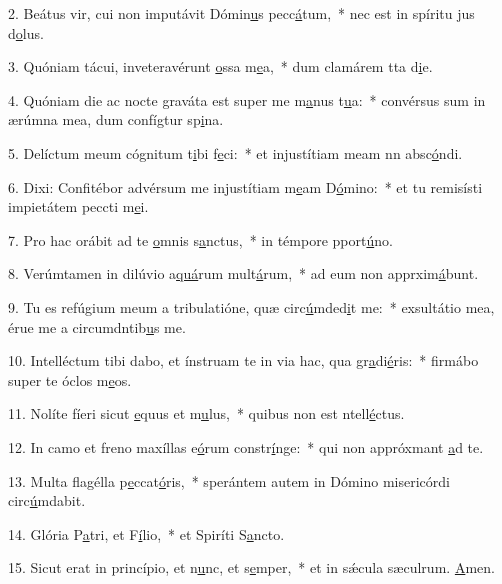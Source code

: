 2. Beátus vir, cui non imputávit Dómin\uline{u}s pecc\uline{á}tum,~* nec est in spíritu jus d\uline{o}lus.\par 
3. Quóniam tácui, inveteravérunt \uline{o}ssa m\uline{e}a,~* dum clamárem tta d\uline{i}e.\par 
4. Quóniam die ac nocte graváta est super me m\uline{a}nus t\uline{u}a:~* convérsus sum in ærúmna mea, dum confígtur sp\uline{i}na.\par 
5. Delíctum meum cógnitum t\uline{i}bi f\uline{e}ci:~* et injustítiam meam nn absc\uline{ó}ndi.\par 
6. Dixi: Confitébor advérsum me injustítiam m\uline{e}am D\uline{ó}mino:~* et tu remisísti impietátem peccti m\uline{e}i.\par 
7. Pro hac orábit ad te \uline{o}mnis s\uline{a}nctus,~* in témpore pport\uline{ú}no.\par 
8. Verúmtamen in dilúvio a\uline{quá}rum mult\uline{á}rum,~* ad eum non apprxim\uline{á}bunt.\par 
9. Tu es refúgium meum a tribulatióne, quæ circ\uline{ú}mded\uline{i}t me:~* exsultátio mea, érue me a circumdntib\uline{u}s me.\par 
10. Intelléctum tibi dabo, et ínstruam te in via hac, qua gr\uline{a}di\uline{é}ris:~* firmábo super te óclos m\uline{e}os.\par 
11. Nolíte fíeri sicut \uline{e}quus et m\uline{u}lus,~* quibus non est ntell\uline{é}ctus.\par 
12. In camo et freno maxíllas e\uline{ó}rum constr\uline{í}nge:~* qui non appróxmant \uline{a}d te.\par 
13. Multa flagélla p\uline{e}ccat\uline{ó}ris,~* sperántem autem in Dómino misericórdi circ\uline{ú}mdabit.\par 
14. Glória P\uline{a}tri, et F\uline{í}lio,~* et Spiríti S\uline{a}ncto.\par 
15. Sicut erat in princípio, et n\uline{u}nc, et s\uline{e}mper,~* et in sǽcula sæculrum. \uline{A}men.\par 
